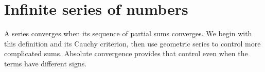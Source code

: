\chapter{Infinite series of numbers}
\label{ch:analysis-i:infinite-series-of-numbers}

A series converges when its sequence of partial sums converges.
We begin with this definition and its Cauchy criterion, then use
geometric series to control more complicated sums. Absolute convergence
provides that control even when the terms have different signs.





